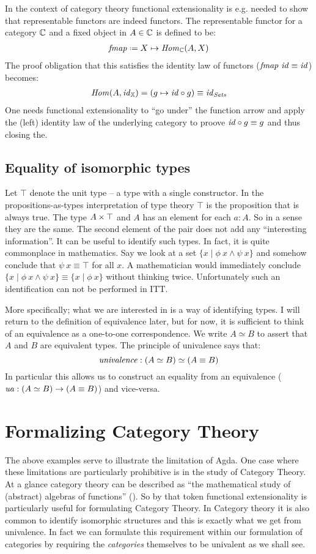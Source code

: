 In the context of category theory functional extensionality is e.g. needed to
show that representable functors are indeed functors. The representable functor
for a category $\mathbb{C}$ and a fixed object in $A \in \mathbb{C}$ is defined to be:
%
\begin{align*}
\fmap \defeq X \mapsto \Hom_{\bC}(A, X)
\end{align*}
%
The proof obligation that this satisfies the identity law of functors
($\mathit{fmap}\ \mathit{id} \equiv \mathit{id}$) becomes:
%
\begin{align*}
\mathit{Hom}(A, \mathit{id}_{\mathbb{X}}) = (g \mapsto \mathit{id} \circ g) \equiv \mathit{id}_{\mathit{Sets}}
\end{align*}
%
One needs functional extensionality to ``go under'' the function arrow and apply
the (left) identity law of the underlying category to proove $\mathit{id} \circ g
\equiv g$ and thus closing the.
%
\subsection{Equality of isomorphic types}
%
Let $\top$ denote the unit type -- a type with a single constructor. In
the propositions-as-types interpretation of type theory $\top$ is the
proposition that is always true. The type $A \times \top$ and $A$ has an element for
each $a : A$. So in a sense they are the same. The second element of the pair
does not add any ``interesting information''. It can be useful to identify such
types. In fact, it is quite commonplace in mathematics. Say we look at a set
$\{x \mid
\phi\ x \land \psi\ x\}$ and somehow conclude that $\psi\ x \equiv \top$ for all
$x$. A mathematician would immediately conclude $\{x \mid \phi\ x \land
\psi\ x\} \equiv \{x \mid \phi\ x\}$ without thinking twice. Unfortunately such
an identification can not be performed in ITT.

More specifically; what we are interested in is a way of identifying
 types. I will return to the definition of equivalence later,
but for now, it is sufficient to think of an equivalence as a one-to-one
correspondence. We write $A \simeq B$ to assert that $A$ and $B$ are equivalent
types. The principle of univalence says that:
%
$$\mathit{univalence} \;\mathord{:}\; (A \simeq B) \simeq (A \equiv B)$$
%
In particular this allows us to construct an equality from an equivalence
($\mathit{ua} \;\mathord{:}\; (A \simeq B) \to (A \equiv B)$) and vice-versa.

\section{Formalizing Category Theory}
%
The above examples serve to illustrate the limitation of Agda. One case where
these limitations are particularly prohibitive is in the study of Category
Theory. At a glance category theory can be described as ``the mathematical study
of (abstract) algebras of functions'' (\cite{awodey-2006}). So by that token
functional extensionality is particularly useful for formulating Category
Theory. In Category theory it is also common to identify isomorphic structures
and this is exactly what we get from univalence. In fact we can formulate this
requirement within our formulation of categories by requiring the
\emph{categories} themselves to be univalent as we shall see.


